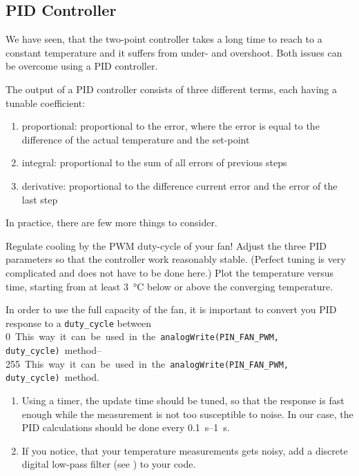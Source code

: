\subsection{PID Controller}
We have seen, that the two-point controller takes a long time to reach to a constant temperature and it suffers from under- and overshoot. Both issues can be overcome using a \ac{PID} controller.\par
%
The output of a \ac{PID} controller consists of three different terms, each having a tunable coefficient:
%
\begin{enumerate}
  \item proportional: proportional to the error, where the error is equal to the difference of the actual temperature and the set-point 
  \item integral: proportional to the sum of all errors of previous steps
  \item derivative: proportional to the difference current error and the error of the last step
\end{enumerate}
%
In practice, there are few more things to consider.
% 
\begin{task}
  Regulate cooling by the \ac{PWM} duty-cycle of your fan! Adjust the three \ac{PID} parameters so that the controller work reasonably stable. (Perfect tuning is very complicated and does not have to be done here.) Plot the temperature versus time, starting from at least \SI{3}{\celsius} below or above the converging temperature.
\end{task}
%
In order to use the full capacity of the fan, it is important to convert you \ac{PID} response to a \texttt{duty_cycle} between \SIrange{0}{255}. This way it can be used in the \texttt{analogWrite(PIN_FAN_PWM, duty_cycle)} method.\par
%
\begin{task}
  \begin{enumerate}
      \item Using a timer, the update time should be tuned, so that the response is fast enough while the measurement is not too susceptible to noise. In our case, the \ac{PID} calculations should be done every \SIrange{.1}{1}{\second}.
      \item If you notice, that your temperature measurements gets noisy, add a discrete digital low-pass filter (see ) to your code.
  \end{enumerate}
\end{task}
